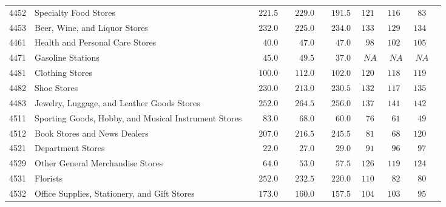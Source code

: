 \documentclass[9pt, oneside]{article}   	%
\begin{document}
\begin{longtable}{lp{3.5 in}ccccccc}
4452  & Specialty Food Stores & $\phantom{00}221.5$ & $\phantom{00}229.0$ & $\phantom{00}191.5$ & $121$ & $116$ & $\phantom{0}83$ \\
4453  & Beer, Wine, and Liquor Stores & $\phantom{00}232.0$ & $\phantom{00}225.0$ & $\phantom{00}234.0$ & $133$ & $129$ & $134$ \\
4461  & Health and Personal Care Stores & $\phantom{000}40.0$ & $\phantom{000}47.0$ & $\phantom{000}47.0$ & $\phantom{0}98$ & $102$ & $105$ \\
4471  & Gasoline Stations & $\phantom{000}45.0$ & $\phantom{000}49.5$ & $\phantom{000}37.0$ & $\phantom{0}NA$ & $\phantom{0}NA$ & $\phantom{0}NA$ \\
4481  & Clothing Stores & $\phantom{00}100.0$ & $\phantom{00}112.0$ & $\phantom{00}102.0$ & $120$ & $118$ & $119$ \\
4482  & Shoe Stores & $\phantom{00}230.0$ & $\phantom{00}213.0$ & $\phantom{00}230.5$ & $132$ & $117$ & $135$ \\
4483  & Jewelry, Luggage, and Leather Goods Stores & $\phantom{00}252.0$ & $\phantom{00}264.5$ & $\phantom{00}256.0$ & $137$ & $141$ & $142$ \\
4511  & Sporting Goods, Hobby, and Musical Instrument Stores & $\phantom{000}83.0$ & $\phantom{000}68.0$ & $\phantom{000}60.0$ & $\phantom{0}76$ & $\phantom{0}61$ & $\phantom{0}49$ \\
4512  & Book Stores and News Dealers & $\phantom{00}207.0$ & $\phantom{00}216.5$ & $\phantom{00}245.5$ & $\phantom{0}81$ & $\phantom{0}68$ & $120$ \\
4521  & Department Stores & $\phantom{000}22.0$ & $\phantom{000}27.0$ & $\phantom{000}29.0$ & $\phantom{0}91$ & $\phantom{0}96$ & $\phantom{0}97$ \\
4529  & Other General Merchandise Stores & $\phantom{000}64.0$ & $\phantom{000}53.0$ & $\phantom{000}57.5$ & $126$ & $119$ & $124$ \\
4531  & Florists & $\phantom{00}252.0$ & $\phantom{00}232.5$ & $\phantom{00}220.0$ & $110$ & $\phantom{0}82$ & $\phantom{0}80$ \\
4532  & Office Supplies, Stationery, and Gift Stores & $\phantom{00}173.0$ & $\phantom{00}160.0$ & $\phantom{00}157.5$ & $104$ & $103$ & $\phantom{0}95$ \\

\end{longtable}
\end{document}
